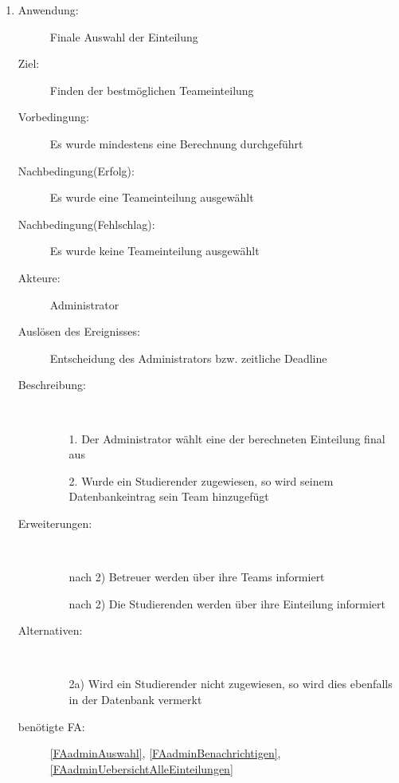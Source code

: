 \documentclass[parskip=full]{scrartcl}
\newcommand{\swtLabel}[1]{\textbf{/#1\arabic*0/}}
\begin{document}
\begin{enumerate} [label=\swtLabel{A}]
  
  \item \label{UCadminEinteilungAuswahl}
  \begin{description}
  \item[Anwendung:] Finale Auswahl der Einteilung
  \item[Ziel:] Finden der bestmöglichen Teameinteilung
  	\item[Vorbedingung:] Es wurde mindestens eine Berechnung durchgeführt
  	\item[Nachbedingung(Erfolg):] Es wurde eine Teameinteilung ausgewählt
  	\item[Nachbedingung(Fehlschlag):] Es wurde keine Teameinteilung ausgewählt
  	\item[Akteure:] Administrator
  	\item[Auslösen des Ereignisses:] Entscheidung des Administrators bzw.
  	zeitliche Deadline
  	\item[Beschreibung:]~
  	\begin{enumerate} 
  	  \item[1.] Der Administrator wählt eine der berechneten Einteilung final aus
  	  \item[2.] Wurde ein Studierender zugewiesen, so wird seinem
  	  Datenbankeintrag sein Team hinzugefügt
  	\end{enumerate}
  	\item[Erweiterungen:]~
  	\begin{enumerate}
  	  \item[nach 2)] Betreuer werden über ihre Teams informiert
  	  \item[nach 2)] Die Studierenden werden über ihre Einteilung informiert
  	 \end{enumerate}
  	\item[Alternativen:] ~
  	\begin{enumerate}
  	  \item[2a)] Wird ein Studierender nicht zugewiesen, so wird dies ebenfalls
  	  in der Datenbank vermerkt
  	 \end{enumerate}  
  	 \item[benötigte FA:] \ref{FAadminAuswahl},
  	 \ref{FAadminBenachrichtigen}, \ref{FAadminUebersichtAlleEinteilungen} 
  \end{description}
   

\end{enumerate}
\end{document}
